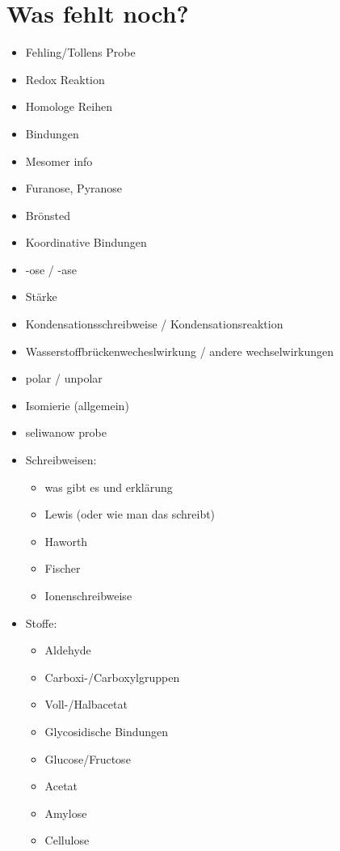 
\chapter{Was fehlt noch?}
\begin{itemize}
    \item Fehling/Tollens Probe
    \item Redox Reaktion
    \item Homologe Reihen
    \item Bindungen
    \item Mesomer info
    \item Furanose, Pyranose
    \item Brönsted
    \item Koordinative Bindungen
    \item -ose / -ase
    \item Stärke
    \item Kondensationsschreibweise / Kondensationsreaktion
    \item Wasserstoffbrückenwecheslwirkung / andere wechselwirkungen
    \item polar / unpolar
    \item Isomierie (allgemein)
    \item seliwanow probe

    \item Schreibweisen:
    \begin{itemize}
        \item was gibt es und erklärung
        \item Lewis (oder wie man das schreibt)
        \item Haworth
        \item Fischer
        \item Ionenschreibweise
    \end{itemize}

    \item Stoffe:
    \begin{itemize}
        \item Aldehyde
        \item Carboxi-/Carboxylgruppen
        \item Voll-/Halbacetat
        \item Glycosidische Bindungen
        \item Glucose/Fructose
        \item Acetat
        \item Amylose
        \item Cellulose
    \end{itemize}
\end{itemize}

